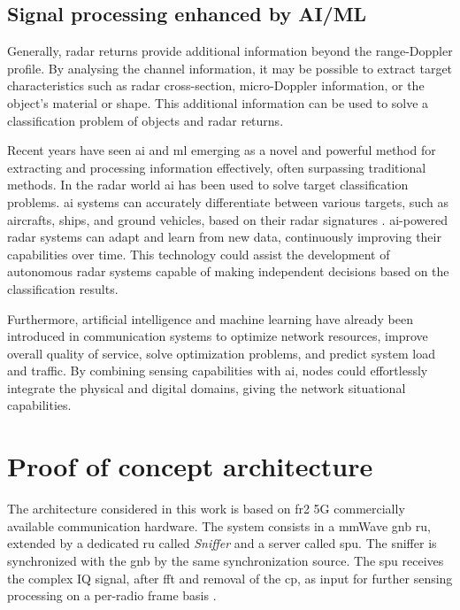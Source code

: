	\subsection{Signal processing enhanced by AI/ML}
	Generally, radar returns provide additional information beyond the range-Doppler profile. 
	By analysing the channel information, it may be possible to extract target characteristics such as radar cross-section, micro-Doppler information, or the object's material or shape.
	This additional information can be used to solve a classification problem of objects and radar returns.
	
	Recent years have seen \gls{ai} and \gls{ml} emerging as a novel and powerful method for extracting and processing information effectively, often surpassing traditional methods.
	In the radar world \gls{ai} has been used to solve target classification problems. 
	\Gls{ai} systems can accurately differentiate between various targets, such as aircrafts, ships, and ground vehicles, based on their radar signatures \cite{survey_radar_AIML}. 
	\gls{ai}-powered radar systems can adapt and learn from new data, continuously improving their capabilities over time. 
	This technology could assist the development of autonomous radar systems capable of making independent decisions based on the classification results. 
	
	 \alert{Furthermore, artificial intelligence and machine learning have already been introduced in communication systems to optimize network resources, improve overall quality of service, solve optimization problems, and predict system load and traffic.} 
	 By combining sensing capabilities with \gls{ai}, nodes could effortlessly integrate the physical and digital domains, giving the network situational capabilities.
	


\section{Proof of concept architecture}
	\label{sec:intro-PoCarchitecture}
	
	The architecture considered in this work is based on \gls{fr2} 5G commercially available communication hardware.
	The system consists in a mmWave \gls{gnb} \gls{ru}, extended by a dedicated \gls{ru} called \textit{Sniffer} and a server called \gls{spu}. 
	The sniffer is synchronized with the \gls{gnb} by the same synchronization source. 
	The \gls{spu} receives the complex IQ signal,  after \gls{fft} and removal of the \gls{cp}, as input for further sensing processing on a per-radio frame basis \cite{Wild_Grudnitsky_Mandelli_Henninger_Guan_Schaich_2023}.
	
